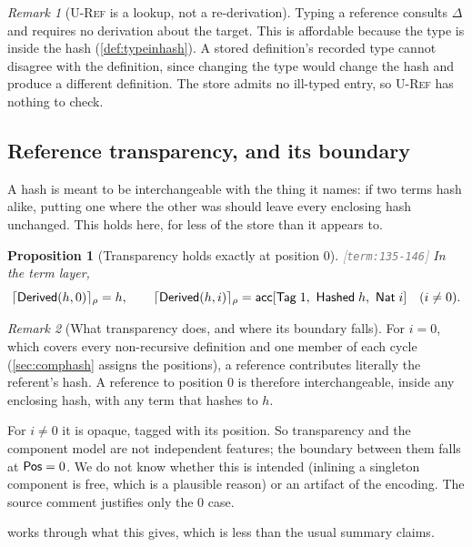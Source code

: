 \documentclass[11pt]{article}
\theoremstyle{definition}
\theoremstyle{plain}
\newtheorem{proposition}{Proposition}[section]
\theoremstyle{remark}
\newtheorem{remark}{Remark}[section]
\newcommand{\src}[1]{{\footnotesize\textcolor{gray}{[\texttt{#1}]}}}
\begin{document}
\begin{remark}[\textsc{U-Ref} is a lookup, not a re-derivation]\label{rem:uref-delta}
Typing a reference consults $\Delta$ and requires no derivation about the target. This is affordable
because the type is inside the hash (\cref{def:typeinhash}). A stored definition's recorded type
cannot disagree with the definition, since changing the type would change the hash and produce a
different definition. The store admits no ill-typed entry, so \textsc{U-Ref} has nothing to check.
\end{remark}

\subsection{Reference transparency, and its boundary}

A hash is meant to be interchangeable with the thing it names: if two terms hash alike, putting one
where the other was should leave every enclosing hash unchanged. This holds here, for less of the
store than it appears to.

\begin{proposition}[Transparency holds exactly at position $0$]\label{prop:transparent}
\src{term:135-146} In the term layer,
\[
  \uhash{\HEnv}{\uref{\UDer{h}{0}}} = h,
  \qquad
  \uhash{\HEnv}{\uref{\UDer{h}{i}}} = \mathsf{acc}[\mathsf{Tag}\;1,\ \mathsf{Hashed}\;h,\ \mathsf{Nat}\;i]
  \quad (i \neq 0).
\]
\end{proposition}

\begin{remark}[What transparency does, and where its boundary falls]\label{rem:transparent}
For $i = 0$, which covers every non-recursive definition and one member of each cycle
(\cref{sec:comphash} assigns the positions), a reference contributes literally the referent's hash.
A reference to position $0$ is therefore interchangeable, inside any enclosing hash, with any term
that hashes to $h$.

For $i \neq 0$ it is opaque, tagged with its position. So transparency and the component model are
not independent features; the boundary between them falls at $\mathsf{Pos} = 0$. We do not know whether this
is intended (inlining a singleton component is free, which is a plausible reason) or an artifact of
the encoding. The source comment justifies only the $0$ case.

 works through what this gives, which is less than the usual summary claims.
\end{remark}
\end{document}
